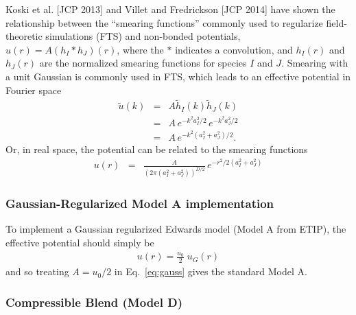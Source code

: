 \documentclass[12pt]{article}
\begin{document}
Koski et al. [JCP 2013] and Villet and Fredrickson [JCP 2014] have shown the relationship between the ``smearing functions'' commonly used to regularize field-theoretic simulations (FTS) and non-bonded potentials, $u(r) = A (h_I \ast h_J)(r)$, where the $\ast$ indicates a convolution, and $h_I(r)$ and $h_J(r)$ are the normalized smearing functions for species $I$ and $J$. Smearing with a unit Gaussian is commonly used in FTS, which leads to an effective potential in Fourier space 
\begin{eqnarray}
\tilde u(k) &=& A \tilde h_I(k) \tilde h_J(k)
\\
\nonumber
&=& A \, e^{-k^2 a_I^2/2} \, e^{-k^2 a_J^2/2}
\\
\nonumber
&=& A \, e^{-k^2 (a_I^2+a_J^2)/2}.
\end{eqnarray}
Or, in real space, the potential can be related to the smearing functions
\begin{eqnarray}
u(r) &=& \frac{A}{(2\pi (a_I^2+a_J^2))^{D/2}} \, e^{-r^2/2(a_I^2+a_J^2)}
\end{eqnarray}

\subsubsection{ Gaussian-Regularized Model A implementation}

To implement a Gaussian regularized Edwards model (Model A from ETIP), the effective potential should simply be 
\begin{eqnarray}
	u(r) = \frac{u_0}{2} \; u_G(r)
\end{eqnarray}
and so treating $A = u_0/2$ in Eq.~\ref{eq:gauss} gives the standard Model A.


\subsubsection{Compressible Blend (Model D)}
\end{document}

